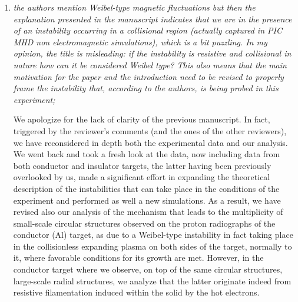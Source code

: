 \documentclass[aps,showpacs,superscriptaddress]{revtex4}%
\begin{document}
\begin{enumerate}
\item  \textit{the authors mention Weibel-type magnetic fluctuations but then the explanation presented in the manuscript indicates that we are in the presence of an instability occurring in a collisional region (actually captured in PIC MHD non electromagnetic simulations), which is a bit puzzling. In my opinion, the title is misleading: if the instability is resistive and collisional in nature how can it be considered Weibel type? This also means that the main motivation for the paper and the introduction need to be revised to properly frame the instability that, according to the authors, is being probed in this experiment; }

We apologize for the lack of clarity of the  previous manuscript.
In fact, triggered by the reviewer’s comments (and the ones of the other reviewers), we have reconsidered in depth both the experimental data and our analysis. We went back and took a fresh look at the data, now including data from both conductor and insulator targets, the latter having been previously overlooked by us, made a significant effort in expanding the theoretical description of the instabilities that can take place in the conditions of the experiment and performed as well a new simulations. 
As a result, we have revised also our analysis of the mechanism that leads to the multiplicity of small-scale circular structures observed on the proton radiographs of the conductor (Al) target, as due to a Weibel-type instability in fact taking place in the collisionless expanding plasma on both sides of the target, normally to it, where favorable conditions for its growth are met.
However, in the conductor target where we observe, on top of the same circular structures, large-scale radial structures, we analyze that the latter originate indeed from resistive filamentation induced within the solid by the hot electrons.


\end{enumerate}
\end{document}
